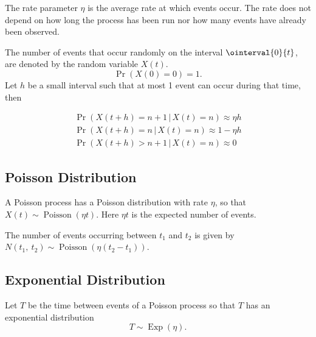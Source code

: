 \documentclass{article}
\begin{document}
\begin{multicols}{3}
    The rate parameter \(\eta\) is the average rate at which events occur.
    The rate does not depend on how long the process has been run nor how many events have already been
    observed.

    The number of events that occur randomly on the interval \(\ointerval{0}{t}\), are denoted by the random variable \(X\left( t \right)\).
    \begin{equation*}
        \Pr{\left( X\left( 0 \right) = 0 \right)} = 1.
    \end{equation*}
    Let \(h\) be a small interval such that at most 1 event can occur during that time, then

    \begin{gather*}
        \Pr{\left( X\left( t + h \right) = n + 1 \,\vert\, X\left( t \right) = n \right)} \approx \eta h     \\
        \Pr{\left( X\left( t + h \right) = n \,\vert\, X\left( t \right) = n \right)}     \approx 1 - \eta h \\
        \Pr{\left( X\left( t + h \right) > n + 1 \,\vert\, X\left( t \right) = n \right)} \approx 0
    \end{gather*}
    \subsection{Poisson Distribution}
    A Poisson process has a Poisson distribution with rate \(\eta\), so that
    \(X\left( t \right) \sim \operatorname{Poisson}{\left( \eta t \right)}\).
    Here \(\eta t\) is the expected number of events.

    The number of events occurring between
    \(t_1\) and \(t_2\) is given by \(N\left( t_1,\: t_2 \right) \sim \operatorname{Poisson}{\left( \eta \left( t_2 - t_1 \right) \right)}\).
    \subsection{Exponential Distribution}
    Let \(T\) be the time between events of a Poisson process so that \(T\) has an exponential distribution
    \begin{equation*}
        T \sim \operatorname{Exp}{\left( \eta \right)}.
    \end{equation*}

\end{multicols}
\end{document}

